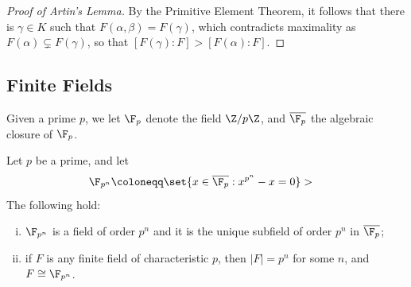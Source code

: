 \documentclass[10pt]{mypackage}
\renewcommand{\coloneq}{\coloneqq}
\begin{document}
\begin{proof}[Proof of Artin's Lemma]
      By the Primitive Element Theorem, it follows that there is $\gamma\in K$ such that $F\left( \alpha,\beta \right) = F\left( \gamma \right)$, which contradicts maximality as $F\left( \alpha \right)\subsetneq F\left( \gamma \right)$, so that $\left[ F\left( \gamma \right):F \right] > \left[ F\left( \alpha \right):F \right]$.
\end{proof}
\subsection{Finite Fields}%
Given a prime $p$, we let $\F_p$ denote the field $\Z/p\Z$, and $ \overline{\F_p} $ the algebraic closure of $\F_p$.
\begin{theorem}
  Let $p$ be a prime, and let
  \begin{align*}
    \F_{p^n} &\coloneq \set{x\in \overline{\F_p} : x^{p^{n}}-x = 0}>
  \end{align*}
  The following hold:
  \begin{enumerate}[(i)]
    \item $\F_{p^n}$ is a field of order $p^{n}$ and it is the unique subfield of order $p^{n}$ in $ \overline{\F_p} $;
    \item if $F$ is any finite field of characteristic $p$, then $\left\vert F \right\vert = p^{n}$ for some $n$, and $F\cong \F_{p^n}$.
  \end{enumerate}
\end{theorem}
\end{document}
